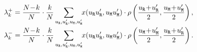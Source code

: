 \documentclass[11pt]{article}
\def\resident{\texttt{R}}
\def\mutant{\texttt{M}}
\theoremstyle{plainCl1}
\theoremstyle{plainCl2}
\begin{document}
\begin{equation}\label{eq:ratio_TwoRounds}
\begin{array}{l}
\displaystyle \lambda^+_k=\frac{N\!-\!k}{N}\cdot \frac{k}{N} \sum_{u_{\resident},u_\resident',u_{\mutant},u_\mutant'} \hspace{-0.1cm} x(u_\resident u_\resident', u_\mutant u_\mutant')\cdot \rho\left(\frac{u_\resident \!+\! u_\resident'}{2}, \frac{u_\mutant \!+\! u_\mutant '}{2}\right), \\[0.5cm]
\displaystyle \lambda^-_k=\frac{N\!-\!k}{N}\cdot \frac{k}{N} \sum_{u_{\resident},u_\resident',u_{\mutant},u_\mutant'} \hspace{-0.1cm} x(u_\resident u_\resident', u_\mutant u_\mutant')\cdot \rho\left( \frac{u_\mutant \!+\! u_\mutant '}{2}, \frac{u_\resident \!+\! u_\resident'}{2}\right).
\end{array}
\end{equation}
 
\end{document}
